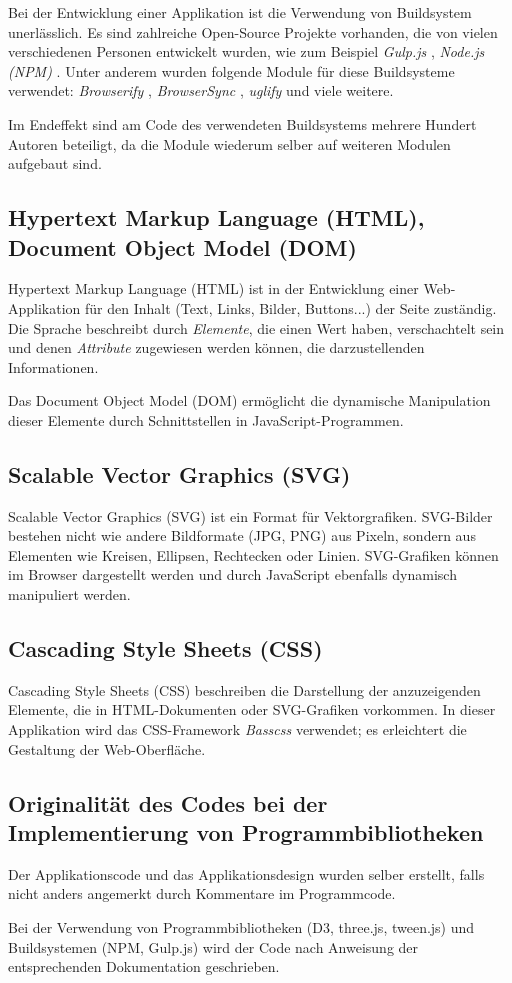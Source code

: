Bei der Entwicklung einer Applikation ist die Verwendung von Buildsystem unerlässlich. Es sind zahlreiche Open-Source Projekte vorhanden, die von vielen verschiedenen Personen entwickelt wurden, wie zum Beispiel \textit{Gulp.js} \cite{gulp.js}, \textit{Node.js (NPM)} \cite{npm}. Unter anderem wurden folgende Module für diese Buildsysteme verwendet: \textit{Browserify} \cite{browserify},  \textit{BrowserSync} \cite{browsersync}, \textit{uglify} \cite{uglify} und viele weitere.

Im Endeffekt sind am Code des verwendeten Buildsystems mehrere Hundert Autoren beteiligt, da die Module wiederum selber auf weiteren Modulen aufgebaut sind.

\subsection{Hypertext Markup Language (HTML), Document Object Model (DOM)} \label{sec:dom}

Hypertext Markup Language (HTML) ist in der Entwicklung einer Web-Applikation für den Inhalt (Text, Links, Bilder, Buttons...) der Seite zuständig. Die Sprache beschreibt durch \textit{Elemente}, die einen Wert haben, verschachtelt sein und denen \textit{Attribute} zugewiesen werden können, die darzustellenden Informationen. 

Das Document Object Model (DOM) ermöglicht die dynamische Manipulation dieser Elemente durch Schnittstellen in JavaScript-Programmen.

\subsection{Scalable Vector Graphics (SVG)}

Scalable Vector Graphics (SVG) ist ein Format für Vektorgrafiken. SVG-Bilder bestehen nicht wie andere Bildformate (JPG, PNG) aus Pixeln, sondern aus Elementen wie Kreisen, Ellipsen, Rechtecken oder Linien. SVG-Grafiken können im Browser dargestellt werden und durch JavaScript ebenfalls dynamisch manipuliert werden.

\subsection{Cascading Style Sheets (CSS)}

Cascading Style Sheets (CSS) beschreiben die Darstellung der anzuzeigenden Elemente, die in HTML-Dokumenten oder SVG-Grafiken vorkommen. In dieser Applikation wird das CSS-Framework \textit{Basscss} \cite{basscss} verwendet; es erleichtert die Gestaltung der Web-Oberfläche.

\subsection{Originalität des Codes bei der Implementierung von Programmbibliotheken}

Der Applikationscode und das Applikationsdesign wurden selber erstellt, falls nicht anders angemerkt durch Kommentare im Programmcode.

Bei der Verwendung von Programmbibliotheken (D3, three.js, tween.js) und Buildsystemen (NPM, Gulp.js) wird der Code nach Anweisung der entsprechenden Dokumentation geschrieben.
